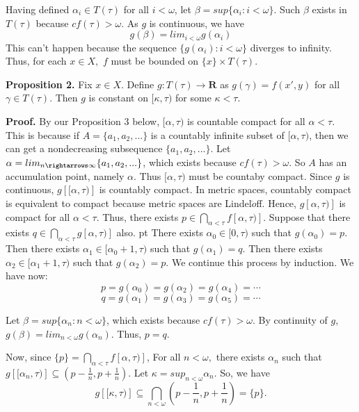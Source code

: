 \documentclass{article}
\begin{document}
\vskip 5pt

Having defined $\alpha_i\in T(\tau)$ for all $i<\omega$, let $\beta=sup\{\alpha_i: i<\omega\}$. Such $\beta$ exists in $T(\tau)$ because $cf(\tau)>\omega$. As $g$ is continuous, we have $$g(\beta)=lim_{i<\omega} g(\alpha_i)$$  This can't happen because the sequence $\{g(\alpha_i): i<\omega\}$ diverges to infinity. Thus, for each $x\in X,$ $f$ must be bounded on $\{x\} \times T(\tau)$. 



\vskip 15pt
\textbf{Proposition 2.} Fix $x \in X$. Define $g: T(\tau)\rightarrow \textbf{R}$ as $g(\gamma)=f(x',y)$ for all $\gamma\in T(\tau).$
Then  $g$ is constant on $[\kappa, \tau)$ for some $\kappa<\tau$.\vskip 10pt


\textbf{Proof.}
By our Proposition 3 below, $[\alpha,\tau)$ is countable compact for all $\alpha < \tau$. 
This is because if $A=\{a_1,a_2,...\}$ is a countably infinite subset of $[\alpha,\tau)$, then 
we can get a nondecreasing subsequence $\{a_1,a_2,...\}$. Let $\alpha=lim_{n\rightarrows \infty} \{a_1,a_2,...\}$, which exists because $cf(\tau)>\omega$. So $A$ has an accumulation point, namely $\alpha$. Thus $[\alpha,\tau)$ must be countaby compact.\vskip 5pt
Since $g$ is continuous, $g\left[[\alpha, \tau)\right]$ is countably compact. In metric spaces, countably compact is equivalent to compact because metric spaces are Lindel$\ddot{o}$ff. Hence, $g\left[\alpha,\tau)\right]$ is compact for all $\alpha<\tau$. 
Thus, there exists $p \in \bigcap_{\alpha<\tau} f\left[\alpha, \tau)\right]$. Suppose that there exists $q \in \bigcap_{\alpha<\tau} g\left[\alpha, \tau)\right]$ also.  pt
There exists $\alpha_0 \in [0,\tau)$ such that $g(\alpha_0)=p$. Then there exists $\alpha_1\in [\alpha_0+1,\tau)$ such that $g(\alpha_1)=q.$ Then there exists $\alpha_2\in [\alpha_1+1,\tau)$ such that $g(\alpha_2)=p.$ We continue this process by induction. We have now: 
$$p=g(\alpha_0)=g(\alpha_2)=g(\alpha_4)=\cdots$$
$$q=g(\alpha_1)=g(\alpha_3)=g(\alpha_5)=\cdots$$

Let $\beta=sup\{\alpha_n: n<\omega\}$, which exists because $cf(\tau)>\omega$. By continuity of $g$, $g(\beta)=lim_{n<\omega} g(\alpha_n)$. Thus, $p=q$. \vskip 5pt

Now, since $\{p\}=\bigcap_{\alpha<\tau} f\left[\alpha, \tau)\right]$, For all $n<\omega,$ there exists $\alpha_n$ such that $g\left[[\alpha_n,\tau)\right] \subseteq (p-\frac{1}{n}, p+\frac{1}{n}).$ Let $\kappa=sup_{n<\omega} \alpha_n$. So, we have $$g\left[[\kappa, \tau)\right] \subseteq \bigcap_{n<\omega} (p-\frac{1}{n}, p+\frac{1}{n})=\{p\}.$$ 
\end{document}
